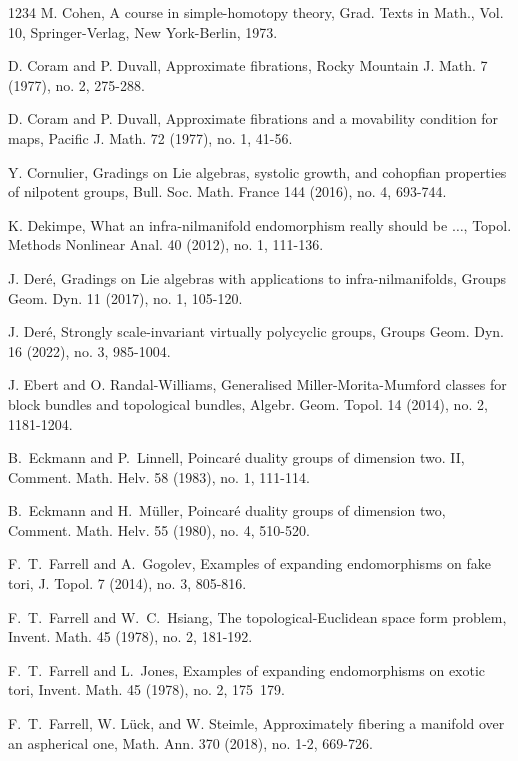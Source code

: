 \documentclass[12pt]{amsart}
\theoremstyle{plain}
\theoremstyle{definition}
\theoremstyle{question}
\theoremstyle{remark}
\theoremstyle{assumption}
\numberwithin{equation}{section}
\theoremstyle{bigthm}
\begin{document}
\begin{thebibliography}{1234}
 M. Cohen, A course in simple-homotopy theory, Grad. Texts in Math., Vol. 10, Springer-Verlag, New York-Berlin, 1973.

 D. Coram and P. Duvall, Approximate fibrations, Rocky Mountain J. Math. 7 (1977), no. 2, 275-288.

 D. Coram and P. Duvall, Approximate fibrations and a movability condition for maps, Pacific J. Math. 72 (1977), no. 1, 41-56.

 Y. Cornulier, Gradings on Lie algebras, systolic growth, and cohopfian properties of nilpotent groups, Bull. Soc. Math. France 144 (2016), no. 4, 693-744.

 K. Dekimpe, What an infra-nilmanifold endomorphism really should be $\dots$, Topol. Methods Nonlinear Anal. 40 (2012), no. 1, 111-136.

 J. Der\'{e}, Gradings on Lie algebras with applications to infra-nilmanifolds, Groups Geom. Dyn. 11 (2017), no. 1, 105-120.

 J. Der\'{e}, Strongly scale-invariant virtually polycyclic groups, Groups Geom. Dyn. 16 (2022), no. 3, 985-1004.

 J. Ebert and O. Randal-Williams, Generalised Miller-Morita-Mumford classes for block bundles and topological bundles, Algebr. Geom. Topol. 14 (2014), no. 2, 1181-1204.

 B.~Eckmann and P.~Linnell, Poincar\'{e} duality groups of dimension two. II, Comment. Math. Helv. 58 (1983), no. 1, 111-114.

 B.~Eckmann and H.~M\"{u}ller, Poincar\'{e} duality groups of dimension two, Comment. Math. Helv. 55 (1980), no. 4, 510-520.

 F.~T.~Farrell and A.~Gogolev, Examples of expanding endomorphisms on fake tori, J. Topol. 7 (2014), no. 3, 805-816.

 F.~T.~Farrell and W.~C.~Hsiang, The topological-Euclidean space form problem, Invent. Math. 45 (1978), no. 2, 181-192.

 F.~T.~Farrell and L.~Jones, Examples of expanding endomorphisms on exotic tori, Invent. Math. 45 (1978), no. 2, 175~179.

 F.~T.~Farrell, W. L\"{u}ck, and W. Steimle, Approximately fibering a manifold over an aspherical one, Math. Ann. 370 (2018), no. 1-2, 669-726.


\end{thebibliography}
\end{document}
